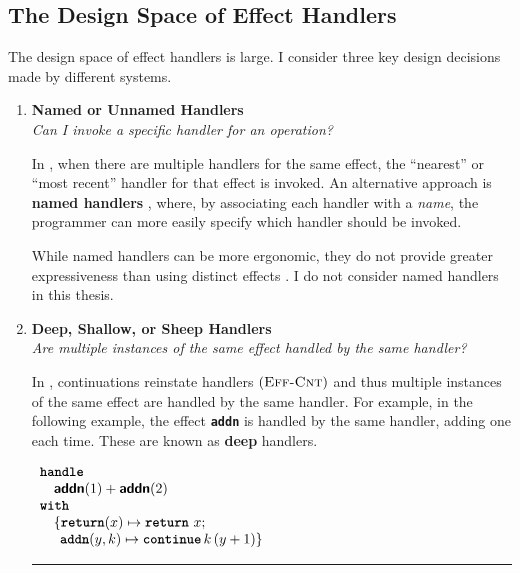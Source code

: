 \subsection{The Design Space of Effect Handlers}\label{subsection:effect-handler-design}
The design space of effect handlers is large. I consider three key design decisions made by different systems.

\renewcommand{\effconfiguration}[2]{{#1}; {#2}}
\renewcommand{\transition}[2]{#1 & \rightarrow & #2}
\newcommand{\rulename}[2]{(\textsc{{#1}-{#2}})}
\newcommand{\reductionRule}[1]{\rulename{Red}{#1}}
\newcommand{\congruenceRule}[1]{\rulename{Cng}{#1}}
\newcommand{\effectRule}[1]{\rulename{Eff}{#1}}

\begin{enumerate} 

 \item \textbf{\textsf{Named or Unnamed Handlers}}\\
        \textit{Can I invoke a specific handler for an operation?}
        
        In \efflang{}, when there are multiple handlers for the same effect, the ``nearest'' or ``most recent'' handler for that effect is invoked. An alternative approach is \textbf{named handlers} \citep{xie-2022}, where, by associating each handler with a \textit{name}, the programmer can more easily specify which handler should be invoked. 

        While named handlers can be more ergonomic, they do not provide greater expressiveness than using distinct effects \citep{xie-2022}. I do not consider named handlers in this thesis.

  \item \textbf{\textsf{Deep, Shallow, or Sheep Handlers}}\\
         \textit{Are multiple instances of the same effect handled by the same handler?}

         In \efflang{}, continuations reinstate handlers $\effectRule{Cnt}$ and thus multiple instances of the same effect are handled by the same handler. For example, in the following example, the effect \textbf{\texttt{addn}} is handled by the same handler, adding one each time. These are known as \textbf{deep} handlers.

         \begin{efflst}
          $\begin{array}{l}
            \textbf{\texttt{handle}} \\
            \quad \textbf{\textsf{addn}}(1) + \textbf{\textsf{addn}}(2) \\
            \textbf{\texttt{with}} \\
            \quad \{ \textbf{\texttt{return}}(x) \mapsto {\texttt{\textbf{return}} \,\, {x}}; \\
            \quad \; \, \textbf{\texttt{addn}}(y, k) \mapsto \textbf{\texttt{continue}} \, {k} \, {(y+1)} \}\\
          \end{array}$
          \vspace{2mm} 
          \textcolor{effComment}{\hrule height 0.2mm \relax}
          \vspace{2mm} 
          

\end{efflst}
\end{enumerate}
